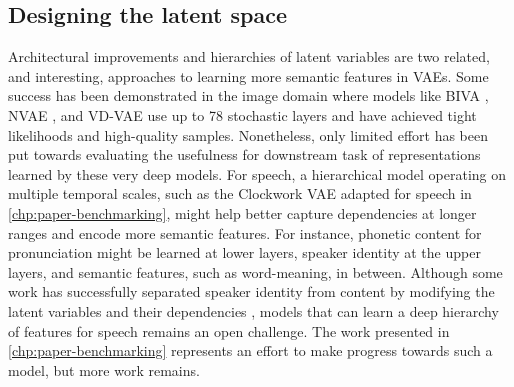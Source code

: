 



\subsection{Designing the latent space} 
Architectural improvements and hierarchies of latent variables are two related, and interesting, approaches to learning more semantic features in VAEs. 
Some success has been demonstrated in the image domain where models like BIVA \parencite{maaloe_biva_2019}, NVAE \parencite{vahdat_nvae_2020}, and VD-VAE \parencite{child_very_2021} use up to 78 stochastic layers and have achieved tight likelihoods and high-quality samples. 
Nonetheless, only limited effort has been put towards evaluating the usefulness for downstream task of representations learned by these very deep models. 
For speech, a hierarchical model operating on multiple temporal scales, such as the Clockwork VAE \parencite{saxena_clockwork_2021} adapted for speech in \cref{chp:paper-benchmarking}, might help better capture dependencies at longer ranges and encode more semantic features. 
For instance, phonetic content for pronunciation might be learned at lower layers, speaker identity at the upper layers, and semantic features, such as word-meaning, in between. 
Although some work has successfully separated speaker identity from content by modifying the latent variables and their dependencies \parencite{hsu_unsupervised_2017}, models that can learn a deep hierarchy of features for speech remains an open challenge. The work presented in \cref{chp:paper-benchmarking} represents an effort to make progress towards such a model, but more work remains.


